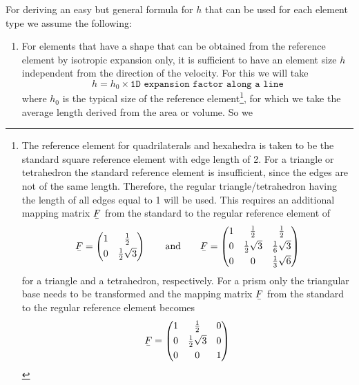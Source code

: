 For deriving an easy but general formula for $h$ that can be used for each
element type we assume the following:
\begin{enumerate}
   \item For elements that have a shape that can be
         obtained from the reference element by 
         isotropic expansion only, it is sufficient to have an element size
         $h$ independent from the direction of the velocity. For this we will
         take
          \[
               h = h_0 \times \texttt{1D expansion factor along a line}
          \]
          where $h_0$ is the typical size of the reference element\footnote{The reference
          element for quadrilaterals and hexahedra is taken to be the standard square reference element
          with edge length of 2. For a triangle or tetrahedron the standard reference element is insufficient, since
          the edges are not of the same length. Therefore, the regular triangle/tetrahedron
          having the length of all edges equal to 1 will be used. This requires an additional mapping matrix $\mat F$
          from the standard to the regular reference element of
          \[
              \mat F = \begin{pmatrix}
                          1 & \frac12 \\[3pt]
                          0 & \frac12\sqrt{3}
                       \end{pmatrix}
         \qquad\text{and}\qquad
              \mat F = \begin{pmatrix}
                          1 & \frac12 & \frac12 \\[3pt]
                          0 & \frac12\sqrt{3} &\frac16\sqrt{3} \\[3pt]
                          0 & 0 & \frac13\sqrt{6}
                       \end{pmatrix}
          \]
          for a triangle and a tetrahedron, respectively. For a prism only the triangular base needs to be transformed and the mapping matrix $\mat F$ from the standard to the regular reference element becomes
          \[
              \mat F = \begin{pmatrix}
                          1 & \frac12 & 0 \\[3pt]
                          0 & \frac12\sqrt{3} & 0\\[3pt]
                          0 & 0 & 1 
                       \end{pmatrix}
          \]
          }, for which
          we take the average length derived from the area or volume. So we

\end{enumerate}
